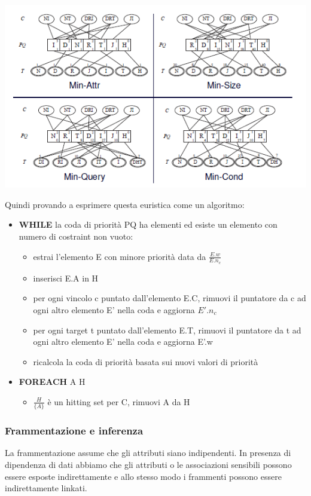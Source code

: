 \begin{center}
    \includegraphics[scale=0.7]{img/heuristic1.png}
\end{center}
Quindi provando a esprimere questa euristica come un algoritmo:\\
\begin{itemize}
    \item \textbf{WHILE} la coda di priorità PQ ha elementi ed esiste un elemento con numero di costraint non vuoto:
    \begin{itemize}
        \item estrai l'elemento E con minore priorità data da \(\frac{E.w}{E.n_c}\)
        \item inserisci E.A in H
        \item per ogni vincolo c puntato dall'elemento E.C, rimuovi il puntatore da c ad ogni altro elemento E' nella coda e aggiorna \(E'.n_c\)
        \item per ogni target t puntato dall'elemento E.T, rimuovi il puntatore da t ad ogni altro elemento E' nella coda e aggiorna E'.w
        \item ricalcola la coda di priorità basata sui nuovi valori di priorità
    \end{itemize}
    \item \textbf{FOREACH} A \in H
    \begin{itemize}
        \item \(\frac{H}{\{A\}}\) è un hitting set per C, rimuovi A da H
    \end{itemize}
\end{itemize}

\subsubsection{Frammentazione e inferenza}
La frammentazione assume che gli attributi siano indipendenti. In presenza di dipendenza di dati abbiamo che gli attributi o le associazioni sensibili possono essere esposte indirettamente e allo stesso modo i frammenti possono essere indirettamente linkati.

